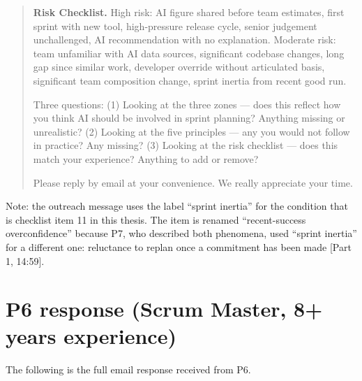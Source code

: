 \documentclass[a4paper,twoside]{bth}
\begin{document}
\begin{quote}
\textbf{Risk Checklist.} High risk: AI figure shared before team estimates, first sprint with new tool, high-pressure release cycle, senior judgement unchallenged, AI recommendation with no explanation. Moderate risk: team unfamiliar with AI data sources, significant codebase changes, long gap since similar work, developer override without articulated basis, significant team composition change, sprint inertia from recent good run.

Three questions: (1) Looking at the three zones --- does this reflect how you think AI should be involved in sprint planning? Anything missing or unrealistic? (2) Looking at the five principles --- any you would not follow in practice? Any missing? (3) Looking at the risk checklist --- does this match your experience? Anything to add or remove?

Please reply by email at your convenience. We really appreciate your time.
\end{quote}

\noindent Note: the outreach message uses the label ``sprint inertia'' for the condition that is checklist item 11 in this thesis. The item is renamed ``recent-success overconfidence'' because P7, who described both phenomena, used ``sprint inertia'' for a different one: reluctance to replan once a commitment has been made [Part 1, 14:59].

\section*{P6 response (Scrum Master, 8+ years experience)}

The following is the full email response received from P6.
\end{document}

